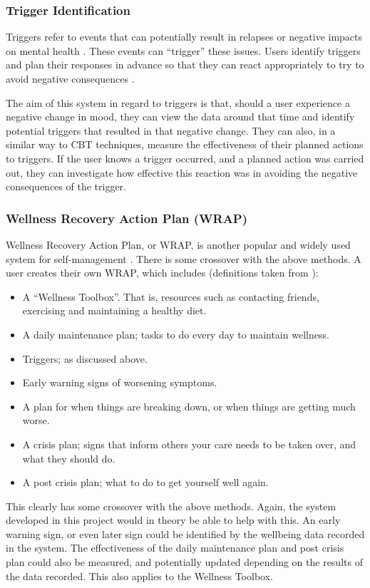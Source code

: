 \documentclass[11pt,openright,a4paper]{report}
\begin{document}
\subsubsection{Trigger Identification}
Triggers refer to events that can potentially result in relapses or negative impacts on mental health \parencite{samhsatriggers}. These events can \enquote{trigger} these issues. Users identify triggers and plan their responses in advance so that they can react appropriately to try to avoid negative consequences \parencite{samhsatriggers}.

The aim of this system in regard to triggers is that, should a user experience a negative change in mood, they can view the data around that time and identify potential triggers that resulted in that negative change. They can also, in a similar way to CBT techniques, measure the effectiveness of their planned actions to triggers. If the user knows a trigger occurred, and a planned action was carried out, they can investigate how effective this reaction was in avoiding the negative consequences of the trigger.

\subsubsection{Wellness Recovery Action Plan (WRAP)}
Wellness Recovery Action Plan, or WRAP, is another popular and widely used system for self-management \parencite{mhrwrap}. There is some crossover with the above methods. A user creates their own WRAP, which includes (definitions taken from \parencite{mhrwrap}):
\begin{itemize}
\item A \enquote{Wellness Toolbox}. That is, resources such as contacting friends, exercising and maintaining a healthy diet.
\item A daily maintenance plan; tasks to do every day to maintain wellness.
\item Triggers; as discussed above.
\item Early warning signs of worsening symptoms.
\item A plan for when things are breaking down, or when things are getting much worse.
\item A crisis plan; signs that inform others your care needs to be taken over, and what they should do.
\item A post crisis plan; what to do to get yourself well again.
\end{itemize}

This clearly has some crossover with the above methods. Again, the system developed in this project would in theory be able to help with this. An early warning sign, or even later sign could be identified by the wellbeing data recorded in the system. The effectiveness of the daily maintenance plan and post crisis plan could also be measured, and potentially updated depending on the results of the data recorded. This also applies to the Wellness Toolbox.
\end{document}
